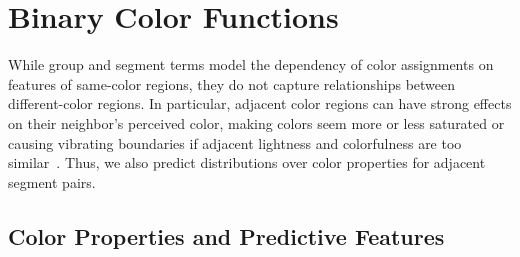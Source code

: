 \section{Binary Color Functions}
\label{sec:binary}

While group and segment terms model the dependency of color assignments on features of same-color regions, they do not capture relationships between different-color regions. In particular, adjacent color regions can have strong effects on their neighbor's perceived color, making colors seem more or less saturated or causing vibrating boundaries if adjacent lightness and colorfulness are too similar~\cite{AlbersInteractionOfColor}. Thus, we also predict distributions over color properties for adjacent segment pairs.

\subsection{Color Properties and Predictive Features}
\label{sec:binaryPropsAndFeatures}


